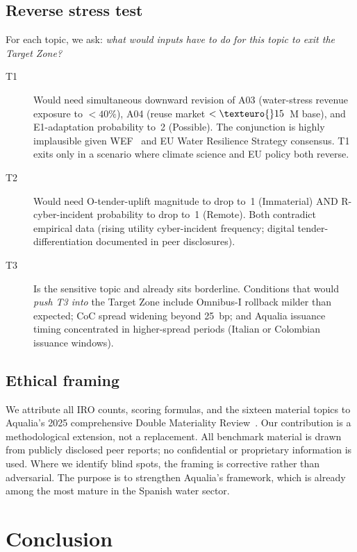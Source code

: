 \documentclass[11pt, a4paper, twoside, openright]{scrreprt}
\newcommand{\euro}{\texteuro}
\begin{document}
\section{Reverse stress test}

For each topic, we ask: \emph{what would inputs have to do for this topic to exit the Target Zone?}

\begin{description}
\item[T1] Would need simultaneous downward revision of A03 (water-stress revenue exposure to $<40\%$), A04 (reuse market $<\euro{}15$~M base), and E1-adaptation probability to~2 (Possible). The conjunction is highly implausible given WEF~\cite{wef2025} and EU Water Resilience Strategy consensus. T1 exits only in a scenario where climate science and EU policy both reverse.

\item[T2] Would need O-tender-uplift magnitude to drop to~1 (Immaterial) AND R-cyber-incident probability to drop to~1 (Remote). Both contradict empirical data (rising utility cyber-incident frequency; digital tender-differentiation documented in peer disclosures).

\item[T3] Is the sensitive topic and already sits borderline. Conditions that would \emph{push T3 into} the Target Zone include Omnibus-I rollback milder than expected; CoC spread widening beyond 25~bp; and Aqualia issuance timing concentrated in higher-spread periods (Italian or Colombian issuance windows).
\end{description}

\section{Ethical framing}

We attribute all IRO counts, scoring formulas, and the sixteen material topics to Aqualia's 2025 comprehensive Double Materiality Review~\cite{aqualiaDMReview2025, aqualiaMethodology2025}. Our contribution is a methodological extension, not a replacement. All benchmark material is drawn from publicly disclosed peer reports; no confidential or proprietary information is used. Where we identify blind spots, the framing is corrective rather than adversarial. The purpose is to strengthen Aqualia's framework, which is already among the most mature in the Spanish water sector.

\chapter{Conclusion}
\label{chap:conclusion}
\end{document}

